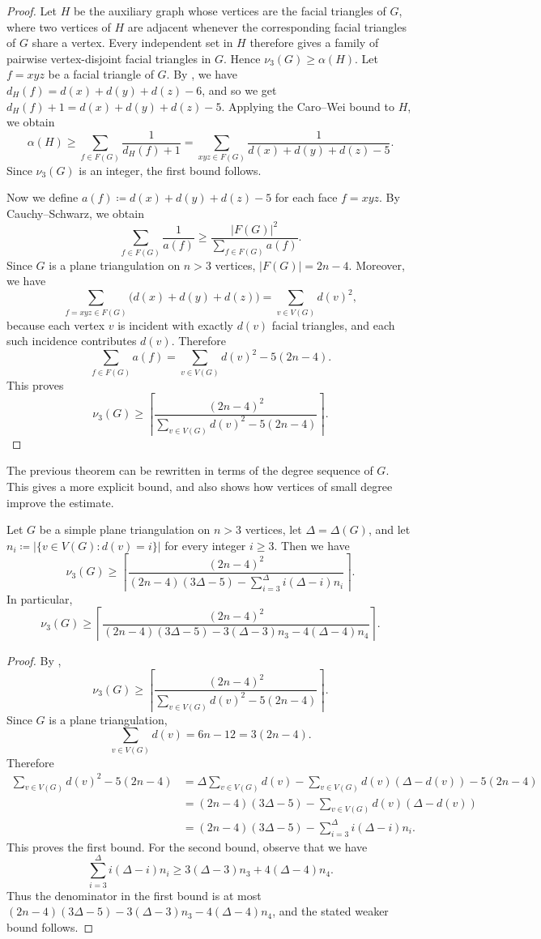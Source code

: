 \documentclass{patmorin}
\begin{document}
\begin{proof}
Let $H$ be the auxiliary graph whose vertices are the facial triangles
of $G$, where two vertices of $H$ are adjacent whenever the corresponding
facial triangles of $G$ share a vertex. Every independent set in $H$
therefore gives a family of pairwise vertex-disjoint facial triangles in
$G$. 
Hence $\nu_3(G)\ge \alpha(H)$.
Let $f=xyz$ be a facial triangle of $G$. 
By , we have $d_H(f)=d(x)+d(y)+d(z)-6$,
and so we get $d_H(f)+1=d(x)+d(y)+d(z)-5$.
Applying the Caro--Wei bound to $H$, we obtain
\[
\alpha(H)
\ge
\sum_{f\in F(G)}\frac{1}{d_H(f)+1}
=
\sum_{xyz\in F(G)}
\frac{1}{d(x)+d(y)+d(z)-5}.
\]
Since $\nu_3(G)$ is an integer, the first bound follows.

Now we define $a(f)\coloneqq d(x)+d(y)+d(z)-5$ for each face $f=xyz$. 
By Cauchy--Schwarz, we obtain
\[
\sum_{f\in F(G)}\frac{1}{a(f)}
\ge
\frac{|F(G)|^2}{\sum_{f\in F(G)}a(f)}.
\]
Since $G$ is a plane triangulation on $n>3$ vertices, $|F(G)|=2n-4$.
Moreover, we have
\[
\sum_{f=xyz\in F(G)}\bigl(d(x)+d(y)+d(z)\bigr)
=
\sum_{v\in V(G)}d(v)^2,
\]
because each vertex $v$ is incident with exactly $d(v)$ facial triangles, and
each such incidence contributes $d(v)$. Therefore
\[
\sum_{f\in F(G)}a(f)
=
\sum_{v\in V(G)}d(v)^2-5(2n-4).
\]
This proves
\[
\nu_3(G)\ge
\left\lceil
\frac{(2n-4)^2}
{\sum_{v\in V(G)}d(v)^2-5(2n-4)}
\right\rceil .
\]
\end{proof}

The previous theorem can be rewritten in terms of the degree sequence of $G$. This gives a more explicit bound, and also shows how vertices of small degree improve the estimate.

\begin{cor}\label{cor:degree-sequence-k3-packing}
Let $G$ be a simple plane triangulation on $n>3$ vertices, let
$\Delta=\Delta(G)$, and let $n_i\coloneqq|\{v\in V(G):d(v)=i\}|$
for every integer $i\ge 3$. 
Then we have 
\[
\nu_3(G)\ge
\left\lceil
\frac{(2n-4)^2}
{(2n-4)(3\Delta-5)-\sum_{i=3}^{\Delta} i(\Delta-i)n_i}
\right\rceil .
\]
In particular,
\[
\nu_3(G)\ge
\left\lceil
\frac{(2n-4)^2}
{(2n-4)(3\Delta-5)-3(\Delta-3)n_3-4(\Delta-4)n_4}
\right\rceil .
\]
\end{cor}

\begin{proof}
By ,
\[
\nu_3(G)\ge
\left\lceil
\frac{(2n-4)^2}
{\sum_{v\in V(G)}d(v)^2-5(2n-4)}
\right\rceil .
\]
Since $G$ is a plane triangulation,
\[
\sum_{v\in V(G)}d(v)=6n-12=3(2n-4).
\]
Therefore
\[
\begin{aligned}
\sum_{v\in V(G)}d(v)^2-5(2n-4)
&=
\Delta\sum_{v\in V(G)}d(v)
-\sum_{v\in V(G)}d(v)(\Delta-d(v))
-5(2n-4)\\
&=
(2n-4)(3\Delta-5)
-\sum_{v\in V(G)}d(v)(\Delta-d(v))\\
&=
(2n-4)(3\Delta-5)
-\sum_{i=3}^{\Delta} i(\Delta-i)n_i.
\end{aligned}
\]
This proves the first bound.
For the second bound, observe that we have
\[
\sum_{i=3}^{\Delta} i(\Delta-i)n_i
\ge
3(\Delta-3)n_3+4(\Delta-4)n_4.
\]
Thus the denominator in the first bound is at most
$(2n-4)(3\Delta-5)-3(\Delta-3)n_3-4(\Delta-4)n_4$,
and the stated weaker bound follows.
\end{proof}
\end{document}
